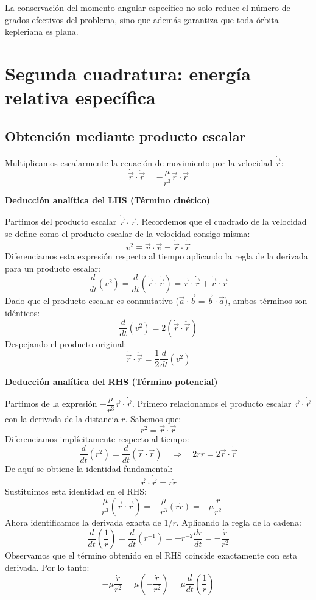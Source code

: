 \begin{importante}
La conservación del momento angular específico no solo reduce el número de grados efectivos del problema, sino que además garantiza que toda órbita kepleriana es plana.
\end{importante}

\section{Segunda cuadratura: energía relativa específica}
\subsection{Obtención mediante producto escalar}
Multiplicamos escalarmente la ecuación de movimiento por la velocidad \(\dot{\vec{r}}\):
\[
\dot{\vec{r}} \cdot \ddot{\vec{r}} = -\frac{\mu}{r^3}\vec{r} \cdot \dot{\vec{r}}
\]

\textbf{Deducción analítica del LHS (Término cinético)}

Partimos del producto escalar $\dot{\vec{r}} \cdot \ddot{\vec{r}}$. Recordemos que el cuadrado de la velocidad se define como el producto escalar de la velocidad consigo misma:
$$
v^2 \equiv \vec{v} \cdot \vec{v} = \dot{\vec{r}} \cdot \dot{\vec{r}}
$$
Diferenciamos esta expresión respecto al tiempo aplicando la regla de la derivada para un producto escalar:
$$
\frac{d}{dt}(v^2) = \frac{d}{dt}(\dot{\vec{r}} \cdot \dot{\vec{r}}) = \ddot{\vec{r}} \cdot \dot{\vec{r}} + \dot{\vec{r}} \cdot \ddot{\vec{r}}
$$
Dado que el producto escalar es conmutativo ($\vec{a} \cdot \vec{b} = \vec{b} \cdot \vec{a}$), ambos términos son idénticos:
$$
\frac{d}{dt}(v^2) = 2(\dot{\vec{r}} \cdot \ddot{\vec{r}})
$$
Despejando el producto original:
$$
\dot{\vec{r}} \cdot \ddot{\vec{r}} = \frac{1}{2}\frac{d}{dt}(v^2)
$$

\textbf{Deducción analítica del RHS (Término potencial)}

Partimos de la expresión $-\dfrac{\mu}{r^3}\vec{r} \cdot \dot{\vec{r}}$. Primero relacionamos el producto escalar $\vec{r} \cdot \dot{\vec{r}}$ con la derivada de la distancia $r$. Sabemos que:
$$
r^2 = \vec{r} \cdot \vec{r}
$$
Diferenciamos implícitamente respecto al tiempo:
$$
\frac{d}{dt}(r^2) = \frac{d}{dt}(\vec{r} \cdot \vec{r}) \quad \Rightarrow \quad 2r\dot{r} = 2\vec{r} \cdot \dot{\vec{r}}
$$
De aquí se obtiene la identidad fundamental:
$$
\vec{r} \cdot \dot{\vec{r}} = r\dot{r}
$$
Sustituimos esta identidad en el RHS:
$$
-\frac{\mu}{r^3}(\vec{r} \cdot \dot{\vec{r}}) = -\frac{\mu}{r^3}(r\dot{r}) = -\mu\frac{\dot{r}}{r^2}
$$
Ahora identificamos la derivada exacta de $1/r$. Aplicando la regla de la cadena:
$$
\frac{d}{dt}\left(\frac{1}{r}\right) = \frac{d}{dt}(r^{-1}) = -r^{-2}\frac{dr}{dt} = -\frac{\dot{r}}{r^2}
$$
Observamos que el término obtenido en el RHS coincide exactamente con esta derivada. Por lo tanto:
$$
-\mu\frac{\dot{r}}{r^2} = \mu\left(-\frac{\dot{r}}{r^2}\right) = \mu\frac{d}{dt}\left(\frac{1}{r}\right)
$$

